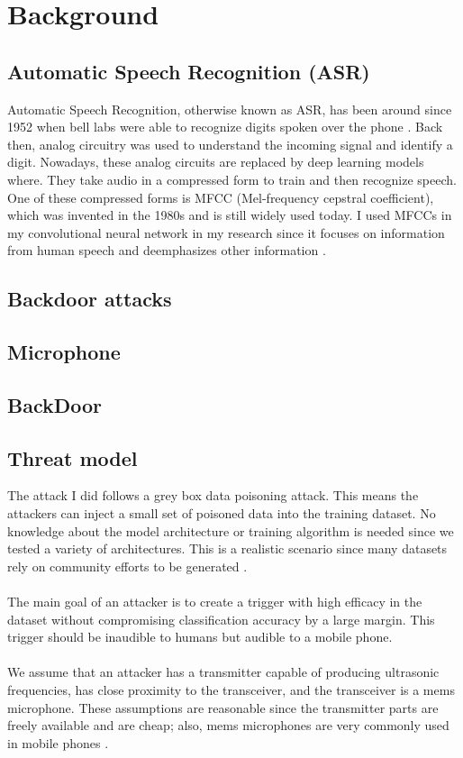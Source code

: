 \documentclass{article}
\theoremstyle{definition}
\theoremstyle{remark}
\begin{document}
\section{Background}
\subsection{Automatic Speech Recognition (ASR)}
Automatic Speech Recognition, otherwise known as ASR, has been around since 1952 when bell labs were able to recognize digits spoken over the phone \cite{ASRHistory}. Back then, analog circuitry was used to understand the incoming signal and identify a digit. Nowadays, these analog circuits are replaced by deep learning models where. They take audio in a compressed form to train and then recognize speech. One of these compressed forms is MFCC (Mel-frequency cepstral coefficient), which was invented in the 1980s and is still widely used today. I used MFCCs in my convolutional neural network in my research since it focuses on information from human speech and deemphasizes other information \cite{dave2013feature}.
\subsection{Backdoor attacks}
\subsection{Microphone}
\subsection{BackDoor}
\cite{roy_backdoor_2017}
\subsection{Threat model}
The attack I did follows a grey box data poisoning attack. This means the attackers can inject a small set of poisoned data into the training dataset. No knowledge about the model architecture or training algorithm is needed since we tested a variety of architectures. This is a realistic scenario since many datasets rely on community efforts to be generated \cite{Speech_commands} \cite{CommonVoice}. \\\\
The main goal of an attacker is to create a trigger with high efficacy in the dataset without compromising classification accuracy by a large margin. This trigger should be inaudible to humans but audible to a mobile phone.\\\\
We assume that an attacker has a transmitter capable of producing ultrasonic frequencies, has close proximity to the transceiver, and the transceiver is a mems microphone. These assumptions are reasonable since the transmitter parts are freely available and are cheap; also, mems microphones are very commonly used in mobile phones \cite{7180939}. 
\end{document}
